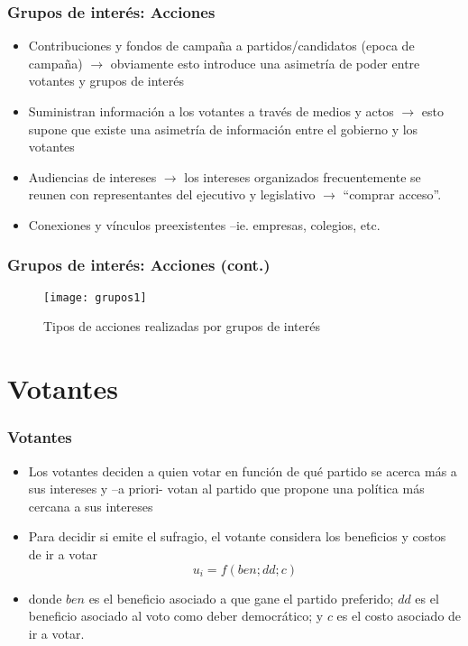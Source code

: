 \documentclass[14pt,aspectratio=169]{beamer}
\begin{document}
\begin{frame}\frametitle{Grupos de interés: Acciones}
\begin{itemize}\itemsep 5pt
\item Contribuciones y fondos de campaña a partidos/candidatos (epoca
  de campaña) $\longrightarrow$ obviamente esto introduce una
  asimetría de poder entre votantes y grupos de interés
\item Suministran información a los votantes a través de medios y
  actos $\longrightarrow$ esto supone que existe una asimetría de
  información entre el gobierno y los votantes
\item Audiencias de intereses $\longrightarrow$ los intereses
  organizados frecuentemente se reunen con representantes del
  ejecutivo y legislativo $\longrightarrow$ ``comprar acceso''.
  \item Conexiones y vínculos preexistentes --ie. empresas, colegios,
    etc. 
\end{itemize}
\end{frame}


\begin{frame}\frametitle{Grupos de interés: Acciones (cont.)}
 \begin{figure}[htbp]\vspace{-1cm}
    \centering
    \texttt{[image: grupos1]}\vspace{-0.75cm}
    \caption{Tipos de acciones realizadas por grupos de interés}
    \label{fig:1}
  \end{figure}
        \end{frame}


\section{Votantes}

\begin{frame}\frametitle{Votantes}
\begin{itemize}\itemsep 15pt
\item Los votantes deciden a quien votar en función de qué
  partido se acerca más a sus intereses y --a priori- votan
  al partido que propone una política más cercana a sus
  intereses
\item Para decidir si emite el sufragio, el votante considera los
  beneficios y costos de ir a votar
\begin{equation}
u_i=f(ben;dd;c)
\end{equation}
\item donde $ben$ es el beneficio asociado a que gane el
  partido preferido; $dd$ es el beneficio asociado al voto
  como deber democrático; y $c$ es el costo asociado de ir a votar. 
\end{itemize}
\end{frame}
\end{document}
